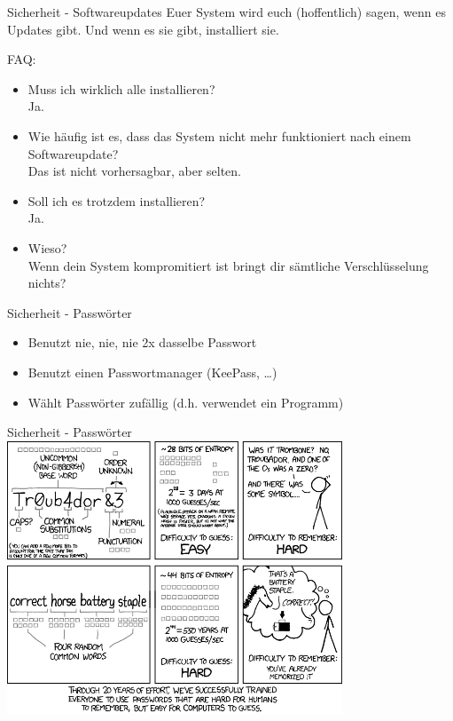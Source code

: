 \documentclass{beamer}
\begin{document}
\begin{frame} {Sicherheit - Softwareupdates}
	Euer System wird euch (hoffentlich) sagen, wenn es Updates gibt. Und wenn es sie gibt, installiert sie.
	\\\hspace{1cm}
	
	FAQ:
	\begin{itemize}
		\item Muss ich wirklich alle installieren? \pause
		\\ Ja. \pause
		\item Wie häufig ist es, dass das System nicht mehr funktioniert nach einem Softwareupdate? \pause
		\\ Das ist nicht vorhersagbar, aber selten. \pause
		\item Soll ich es trotzdem installieren? \pause
		\\ Ja. \pause
		\item Wieso? \pause
		\\ Wenn dein System kompromitiert ist bringt dir sämtliche Verschlüsselung nichts?
	\end{itemize}
\end{frame}

\begin{frame}{Sicherheit - Passwörter}
	\begin{itemize}
		\item Benutzt nie, nie, nie 2x dasselbe Passwort
                \item Benutzt einen Passwortmanager (KeePass, \dots)
                \item Wählt Passwörter zufällig (d.h. verwendet ein Programm)
	\end{itemize}
\end{frame}

\begin{frame}{Sicherheit - Passwörter}
	\includegraphics[width=10cm]{password_strength.png}
\end{frame}
\end{document}
